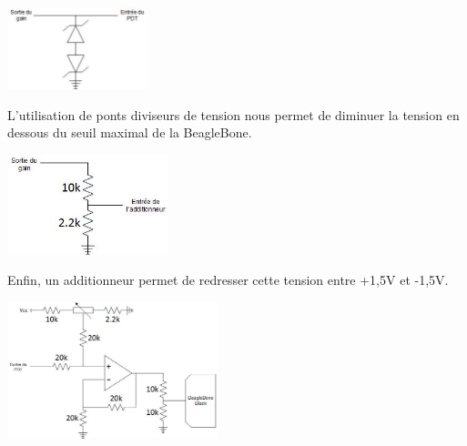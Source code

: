 \documentclass{report}
\begin{document}
\begin{center}
 \includegraphics[height=90]{./Schema/ecretage.jpg}
\end{center}

L’utilisation de ponts diviseurs de tension nous permet de diminuer la tension en dessous du
seuil maximal de la BeagleBone.\\

\begin{center}
 \includegraphics[height=110]{./Schema/div_tension.jpg}
\end{center}

Enfin, un additionneur permet de redresser cette tension entre +1,5V et -1,5V. \\

\begin{center}
 \includegraphics[height=150]{./Schema/add_offset.jpg}
\end{center}
\end{document}
